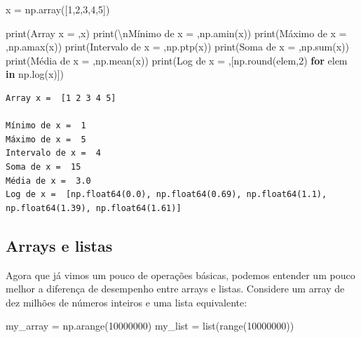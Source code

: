 \documentclass[
  brazilian,
  letterpaper,
  DIV=11,
  numbers=noendperiod]{scrreprt}
\newenvironment{Shaded}{\begin{snugshade}}{\end{snugshade}}
\newcommand{\BuiltInTok}[1]{\textcolor[rgb]{0.00,0.23,0.31}{#1}}
\newcommand{\CharTok}[1]{\textcolor[rgb]{0.13,0.47,0.30}{#1}}
\newcommand{\ControlFlowTok}[1]{\textcolor[rgb]{0.00,0.23,0.31}{\textbf{#1}}}
\newcommand{\DecValTok}[1]{\textcolor[rgb]{0.68,0.00,0.00}{#1}}
\newcommand{\KeywordTok}[1]{\textcolor[rgb]{0.00,0.23,0.31}{\textbf{#1}}}
\newcommand{\NormalTok}[1]{\textcolor[rgb]{0.00,0.23,0.31}{#1}}
\newcommand{\OperatorTok}[1]{\textcolor[rgb]{0.37,0.37,0.37}{#1}}
\newcommand{\StringTok}[1]{\textcolor[rgb]{0.13,0.47,0.30}{#1}}
\begin{document}
\begin{Shaded}
\begin{Highlighting}[]
\NormalTok{x }\OperatorTok{=}\NormalTok{ np.array([}\DecValTok{1}\NormalTok{,}\DecValTok{2}\NormalTok{,}\DecValTok{3}\NormalTok{,}\DecValTok{4}\NormalTok{,}\DecValTok{5}\NormalTok{])}

\BuiltInTok{print}\NormalTok{(}\StringTok{\textquotesingle{}Array x = \textquotesingle{}}\NormalTok{,x)}
\BuiltInTok{print}\NormalTok{(}\StringTok{\textquotesingle{}}\CharTok{\textbackslash{}n}\StringTok{Mínimo de x = \textquotesingle{}}\NormalTok{,np.amin(x))}
\BuiltInTok{print}\NormalTok{(}\StringTok{\textquotesingle{}Máximo de x = \textquotesingle{}}\NormalTok{,np.amax(x))}
\BuiltInTok{print}\NormalTok{(}\StringTok{\textquotesingle{}Intervalo de x = \textquotesingle{}}\NormalTok{,np.ptp(x))}
\BuiltInTok{print}\NormalTok{(}\StringTok{\textquotesingle{}Soma de x = \textquotesingle{}}\NormalTok{,np.}\BuiltInTok{sum}\NormalTok{(x))}
\BuiltInTok{print}\NormalTok{(}\StringTok{\textquotesingle{}Média de x = \textquotesingle{}}\NormalTok{,np.mean(x))}
\BuiltInTok{print}\NormalTok{(}\StringTok{\textquotesingle{}Log de x = \textquotesingle{}}\NormalTok{,[np.}\BuiltInTok{round}\NormalTok{(elem,}\DecValTok{2}\NormalTok{) }\ControlFlowTok{for}\NormalTok{ elem }\KeywordTok{in}\NormalTok{ np.log(x)])}
\end{Highlighting}
\end{Shaded}

\begin{verbatim}
Array x =  [1 2 3 4 5]

Mínimo de x =  1
Máximo de x =  5
Intervalo de x =  4
Soma de x =  15
Média de x =  3.0
Log de x =  [np.float64(0.0), np.float64(0.69), np.float64(1.1), np.float64(1.39), np.float64(1.61)]
\end{verbatim}

\subsection{Arrays e listas}\label{arrays-e-listas}

Agora que já vimos um pouco de operações básicas, podemos entender um
pouco melhor a diferença de desempenho entre arrays e listas. Considere
um array de dez milhões de números inteiros e uma lista equivalente:

\begin{Shaded}
\begin{Highlighting}[]
\NormalTok{my\_array }\OperatorTok{=}\NormalTok{ np.arange(}\DecValTok{10000000}\NormalTok{)}
\NormalTok{my\_list }\OperatorTok{=} \BuiltInTok{list}\NormalTok{(}\BuiltInTok{range}\NormalTok{(}\DecValTok{10000000}\NormalTok{))}
\end{Highlighting}
\end{Shaded}
\end{document}
